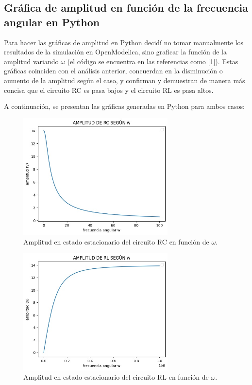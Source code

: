 \documentclass{article}
\begin{document}
\subsection{Gráfica de amplitud en función de la frecuencia angular en Python}

Para hacer las gráficas de amplitud en Python decidí no tomar manualmente los resultados de la simulación en OpenModelica, sino graficar la función de la amplitud variando $\omega$ (el código se encuentra en las referencias como [1]). Estas gráficas coinciden con el análisis anterior, concuerdan en la disminución o aumento de la amplitud según el caso, y confirman y demuestran de manera más concisa que el circuito RC es pasa bajos y el circuito RL es pasa altos.

A continuación, se presentan las gráficas generadas en Python para ambos casos:

\begin{figure}[H]
    \centering
    \includegraphics[width=0.7\textwidth]{AmSRC.jpg}
    \caption{Amplitud en estado estacionario del circuito RC en función de $\omega$.}
\end{figure}

\begin{figure}[H]
    \centering
    \includegraphics[width=0.7\textwidth]{AmSRL.jpg}
    \caption{Amplitud en estado estacionario del circuito RL en función de $\omega$.}
\end{figure}
\end{document}
